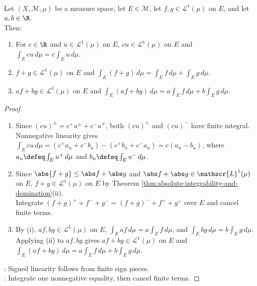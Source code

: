 \begin{proposition} \label{prop:lebesgue-integral-linearity} \\
Let $(X,\mathcal{M},\mu)$ be a measure space, let $E\in\mathcal{M}$, let $f,g\in\mathscr{L}^1(\mu)$ on $E$, and let $a,b\in\R$.\\
Then:
\begin{enumerate}[label=(\roman*)]
\setlength{\itemsep}{0pt}
\item For $c\in\R$ and $u\in\mathscr{L}^1(\mu)$ on $E$, $cu\in\mathscr{L}^1(\mu)$ on $E$ and $\int_Ecu\,d\mu=c\int_Eu\,d\mu$.
\item $f+g\in\mathscr{L}^1(\mu)$ on $E$ and $\int_E(f+g)\,d\mu=\int_Ef\,d\mu+\int_Eg\,d\mu$.
\item $af+bg\in\mathscr{L}^1(\mu)$ on $E$ and $\int_E(af+bg)\,d\mu=a\int_Ef\,d\mu+b\int_Eg\,d\mu$.
\end{enumerate}
\begin{proof}
\begin{enumerate}[label=(\roman*)]
\setlength{\itemsep}{0pt}
\item Since $(cu)^\pm=c^+u^\pm+c^-u^\mp$, both $(cu)^+$ and $(cu)^-$ have finite integral. Nonnegative linearity gives $\int_Ecu\,d\mu=(c^+a_u+c^-b_u)-(c^+b_u+c^-a_u)=c(a_u-b_u)$, where $a_u\defeq\int_Eu^+\,d\mu$ and $b_u\defeq\int_Eu^-\,d\mu$.
\item Since $\abs{f+g}\leq\abs f+\abs g$ and $\abs f+\abs g\in\mathscr{L}^1(\mu)$ on $E$, $f+g\in\mathscr{L}^1(\mu)$ on $E$ by Theorem \ref{thm:absolute-integrability-and-domination}(ii).\\
Integrate $(f+g)^+ + f^- + g^- = (f+g)^- + f^+ + g^+$ over $E$ and cancel finite terms.
\item By (i), $af,bg\in\mathscr{L}^1(\mu)$ on $E$, $\int_Eaf\,d\mu=a\int_Ef\,d\mu$, and $\int_Ebg\,d\mu=b\int_Eg\,d\mu$.\\
Applying (ii) to $af,bg$ gives $af+bg\in\mathscr{L}^1(\mu)$ on $E$ and $\int_E(af+bg)\,d\mu=a\int_Ef\,d\mu+b\int_Eg\,d\mu$.
\end{enumerate}
: Signed linearity follows from finite sign pieces.\\
: Integrate one nonnegative equality, then cancel finite terms.
\end{proof}
\end{proposition}

